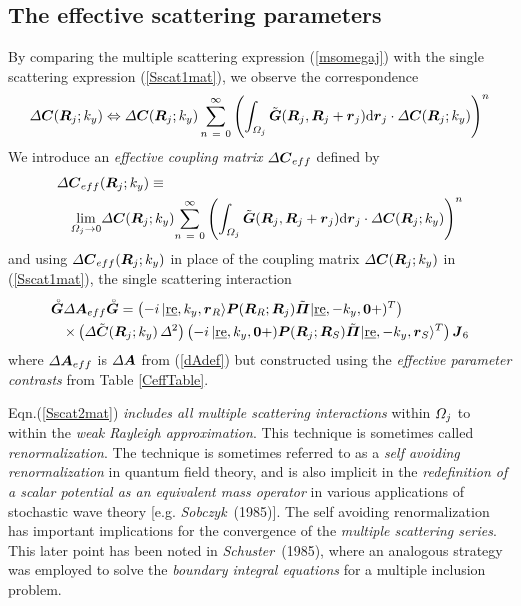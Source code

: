 \subsection{The effective scattering parameters}
By comparing the multiple scattering expression (\ref{msomegaj}) with the 
single scattering expression (\ref{Sscat1mat}), we observe the correspondence
\[
{\mit \Delta}{\mbox{\boldmath$\mit C$\unboldmath}}({\mbox{\boldmath$\mit R$\unboldmath}}_j;k_y)
\Leftrightarrow
{\mit \Delta}{\mbox{\boldmath$\mit C$\unboldmath}}({\mbox{\boldmath$\mit R$\unboldmath}}_j;k_y)
\sum\limits_{ n\ =\ 0}^{ \infty }\left(\int_{{\mit \Omega }_{j}}{\tilde{\mbox{\boldmath$\mit G$\unboldmath}}}({\mbox{\boldmath$\mit R$\unboldmath}}_j,{\mbox{\boldmath$\mit R$\unboldmath}}_j+{\mbox{\boldmath$\mit r$\unboldmath}}_j){\rm d}{\mbox{\boldmath$\mit r$\unboldmath}}_j \cdot{\mit \Delta}{\mbox{\boldmath$\mit C$\unboldmath}}({\mbox{\boldmath$\mit R$\unboldmath}}_j;k_y)\right)^n
\]
We introduce an {\em effective coupling matrix\/} ${\mit \Delta}{\mbox{\boldmath$\mit C$\unboldmath}}_{eff}$ defined by
\begin{eqnarray} \label{dCeff0}
\lefteqn{{\mit \Delta}{\bmi 
	C}_{eff}({\bmi R}_j;k_y)\equiv}\nonumber\\
	&&
\lim\limits_{{ \mit \Omega }_{j} \rightarrow   0}\! 
{\mit \Delta}{\bmi 	C}({\bmi R}_j;k_y)\!
\sum\limits_{ n\ =\ 0}^{ \infty }\left(\int_{{\mit \Omega }_{j}}{\tilde{\bmi  
G}}({\bmi 
R}_j,{\bmi  R}_j+{\bmi  r}_j){\rm d}{\bmi r}_j \cdot{\mit \Delta}{\bmi 
	C}({\bmi R}_j;k_y)\right)^n
\end{eqnarray}
and using ${\mit \Delta}{\mbox{\boldmath$\mit C$\unboldmath}}_{eff}({\mbox{\boldmath$\mit R$\unboldmath}}_j;k_y)$ 
in place of the coupling 
matrix ${\mit \Delta}{\mbox{\boldmath$\mit C$\unboldmath}}({\mbox{\boldmath$\mit R$\unboldmath}}_j;k_y)$ in (\ref{Sscat1mat}),  
the single scattering interaction
\begin{eqnarray} \label{Sscat2mat}
\lefteqn{{\rf{\bmi G}}{\mit \Delta} {\bmi A}_{eff} {\rf{\bmi G}}=
\left(-i\,|\re,k_y,{\bmi r}_R\rangle {\bmi  P}({\bmi  R}_{R};{\bmi  R}_{j})
	\tilde{\bmi \Pi}|\re,-k_y,{\bf 0}+)^{T}\right)}\nonumber\\
&&\times\left({\mit \Delta}\tilde{\bmi 
	C}({\bmi R}_j;k_y)\,{\mit \Delta}^2  \right)
\left( -i\,|\re,k_y,{\bf 0}+) {\bmi  P}({\bmi  R}_{j};{\bmi  R}_{S})
	\tilde{\bmi \Pi}|\re,-k_y,{\bmi r}_S\rangle^{T}\right){\bmi J}_{6}
\end{eqnarray}
where ${\mit \Delta} {\mbox{\boldmath$\mit A$\unboldmath}}_{eff}$ is ${\mit \Delta} {\mbox{\boldmath$\mit A$\unboldmath}}$ from (\ref{dAdef}) but 
constructed using the {\em effective parameter contrasts\/} from 
Table \ref{CeffTable}.

Eqn.(\ref{Sscat2mat}) {\em includes all multiple scattering interactions\/} within ${ \mit 
\Omega }_{j}$ to within the {\em weak Rayleigh approximation\/}. This technique is 
sometimes called {\em renormalization\/}. 
The technique is sometimes 
referred to as a {\em self avoiding renormalization\/} in quantum field 
theory, and is also implicit in the {\em redefinition of a scalar potential as 
an equivalent mass operator\/} in various applications of stochastic wave 
theory [e.g. {\em Sobczyk\/}~(1985)]. The self avoiding renormalization has important implications 
for the convergence of the {\em multiple scattering series\/}. This later 
point has been noted in {\em Schuster\/}~(1985), where an 
analogous strategy was employed to solve the {\em boundary integral 
equations\/} for a multiple inclusion problem. 



